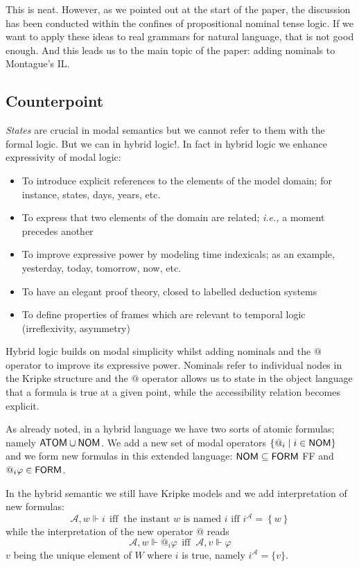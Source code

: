 This is neat. However, as we pointed out at the start of the paper, the
discussion has been conducted within the confines of propositional nominal
tense logic. If we want to apply these ideas to real grammars for natural
language, that is not good enough. And this leads us to the main topic of
the paper: adding nominals to Montague's IL.

\subsection{Counterpoint}

\emph{States} are crucial in modal semantics but we cannot refer to them with the formal logic. But we can in hybrid logic!. In fact in hybrid logic
we enhance expressivity of modal logic:

\begin{itemize}
\item To introduce explicit references to the elements of the model domain;
for instance, states, days, years, etc.

\item To express that two elements of the domain are related; \emph{i.e.,}
a moment precedes another

\item To improve expressive power by modeling time indexicals; as an
example, yesterday, today, tomorrow, now, etc.

\item To have an elegant proof theory, closed to labelled deduction systems

\item To define properties of frames which are relevant to temporal logic
(irreflexivity, asymmetry)
\end{itemize}

Hybrid logic builds on modal simplicity whilst adding nominals and the $@$
operator to improve its expressive power. 
Nominals refer to individual nodes in the Kripke structure and the $@$
operator allows us to state in the object language that a formula is true at
a given point, while the accessibility relation becomes explicit.

As already noted, in a hybrid language we have two sorts of atomic formulas;
namely $\textsf{ATOM} \cup \textsf{NOM}$. We add a new set of modal
operators $\{ @_{i}\mid i\in \textsf{NOM}\}$ and we form new
formulas in this extended language: $\textsf{NOM} \subseteq \textsf{FORM}$ FF
and $@_{i}\varphi \in \textsf{FORM}$.

In the hybrid semantic we still have Kripke models and we add interpretation
of new formulas:
$$
\mathcal{A},w\Vdash i~\ \text{iff\ }~\text{the instant }w\text{ is named\ }i%
\text{ iff \ }i^{\mathcal{A}}=\left\{ w\right\}
$$
while the interpretation of the new operator $@$ reads%
$$
\mathcal{A},w\Vdash @_{i}\varphi ~\ \text{iff\ }~\mathcal{A},v\Vdash \varphi
$$
$v$ being the unique element of $W$ where $i$ is true, namely 
$i^{\mathcal{A}}=\{v\}$.

